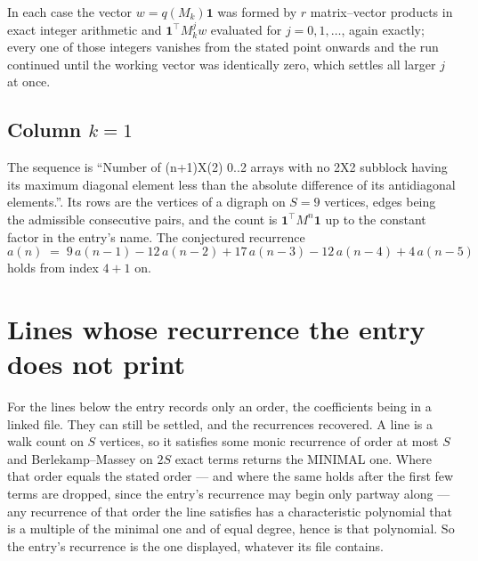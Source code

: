 \documentclass[11pt,a4paper]{article}
\theoremstyle{plain}
\theoremstyle{definition}
\begin{document}
In each case the vector $w=q(M_k)\mathbf{1}$ was formed by $r$ matrix--vector products in
exact integer arithmetic and $\mathbf{1}^{\!\top}M_k^{j}w$ evaluated for $j=0,1,\dots$,
again exactly; every one of those integers vanishes from the stated point onwards and the run
continued until the working vector was identically zero, which settles all larger $j$ at once.

\subsection*{Column $k$$=1$}
The sequence is ``Number of (n+1)X(2) 0..2 arrays with no 2X2 subblock having its maximum diagonal element less than the absolute difference of its antidiagonal elements.''. Its rows are the vertices of a digraph on
$S=9$ vertices, edges being the admissible consecutive pairs, and the count is
$\mathbf{1}^{\!\top}M^{n}\mathbf{1}$ up to the constant factor in the entry's name.
The conjectured recurrence
\[
a(n)\;=\;9\,a(n-1) - 12\,a(n-2) + 17\,a(n-3) - 12\,a(n-4) + 4\,a(n-5)
\]
holds from index $4+1$ on.


\section{Lines whose recurrence the entry does not print}

For the lines below the entry records only an order, the coefficients being in a linked file.
They can still be settled, and the recurrences recovered. A line is a walk count on $S$
vertices, so it satisfies some monic recurrence of order at most $S$ and Berlekamp--Massey on
$2S$ exact terms returns the MINIMAL one. Where that order equals the stated order --- and
where the same holds after the first few terms are dropped, since the entry's recurrence may
begin only partway along --- any recurrence of that order the line satisfies has a
characteristic polynomial that is a multiple of the minimal one and of equal degree, hence is
that polynomial. So the entry's recurrence is the one displayed, whatever its file contains.
\end{document}
